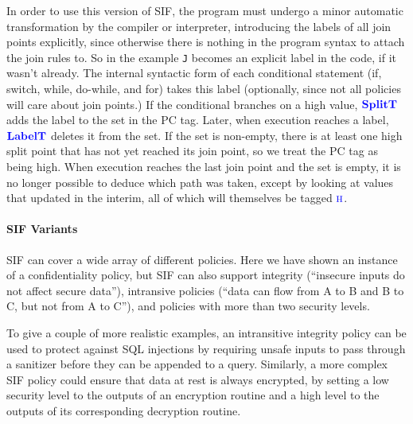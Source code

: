 \documentclass{llncs}
\begin{document}
In order to use this version of SIF, the program must undergo a minor automatic transformation
by the compiler or interpreter, introducing
the labels of all join points explicitly, since otherwise there is nothing in the program
syntax to attach the join rules to. So in the example {\tt J} becomes an explicit label in the code,
if it wasn't already. 
The internal syntactic form of each conditional statement (if, switch, while, do-while, and for)
takes this label (optionally, since not all policies will care about join points.)
If the conditional branches on a high value, \(\color{blue} \mathbf{SplitT}\) adds the label to the set
in the PC tag. Later, when execution reaches a label, \(\color{blue} \mathbf{LabelT}\) deletes it from the
set. If the set is non-empty, there is at least one high split point that has not
yet reached its join point, so we treat the PC tag as being high. When execution reaches the
last join point and the set is empty, it is no longer possible to deduce which
path was taken, except by looking at values that updated in the interim, all of which
will themselves be tagged \(\textnormal{\color{blue} \sc h}\).

\paragraph*{SIF Variants}

SIF can cover a wide array of different policies. Here we have shown an instance of
a confidentiality policy, but SIF can also support integrity
(``insecure inputs do not affect secure data''), intransive policies
(``data can flow from A to B and B to C, but not from A to C''), and policies with
more than two security levels.

To give a couple of more realistic examples, an intransitive integrity policy
can be used to protect against SQL injections by requiring unsafe inputs to pass through a sanitizer
before they can be appended to a query. Similarly, a more complex SIF policy could ensure that
data at rest is always encrypted, by setting a low security level to the outputs of an encryption
routine and a high level to the outputs of its corresponding decryption routine.
\end{document}
